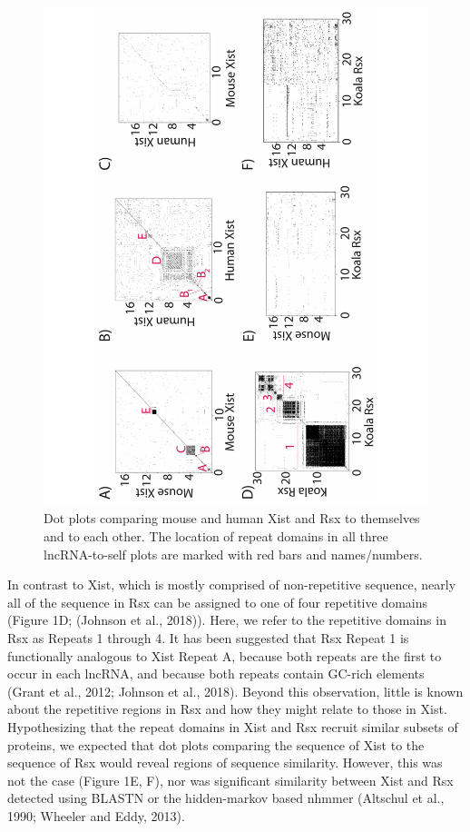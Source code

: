 \begin{figure}[!h]
\centering
\includegraphics[angle=-90, width=\textwidth]{images/fig1-v2-01.pdf}
\caption{Dot plots comparing mouse and human Xist and Rsx to themselves and to each other. The location of repeat domains in all three lncRNA-to-self plots are marked with red bars and names/numbers.}
\end{figure}

In contrast to Xist, which is mostly comprised of non-repetitive sequence, nearly all of the sequence in Rsx can be assigned to one of four repetitive domains (Figure 1D; (Johnson et al., 2018)). Here, we refer to the repetitive domains in Rsx as Repeats 1 through 4. It has been suggested that Rsx Repeat 1 is functionally analogous to Xist Repeat A, because both repeats are the first to occur in each lncRNA, and because both repeats contain GC-rich elements (Grant et al., 2012; Johnson et al., 2018). Beyond this observation, little is known about the repetitive regions in Rsx and how they might relate to those in Xist. Hypothesizing that the repeat domains in Xist and Rsx recruit similar subsets of proteins, we expected that dot plots comparing the sequence of Xist to the sequence of Rsx would reveal regions of sequence similarity. However, this was not the case (Figure 1E, F), nor was significant similarity between Xist and Rsx detected using BLASTN or the hidden-markov based nhmmer (Altschul et al., 1990; Wheeler and Eddy, 2013). 

